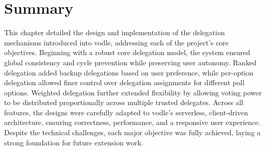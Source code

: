 \section{Summary}

This chapter detailed the design and implementation of the delegation mechanisms introduced into vodle, addressing each of the project's core objectives. Beginning with a robust core delegation model, the system ensured global consistency and cycle prevention while preserving user autonomy. Ranked delegation added backup delegations based on user preference, while per-option delegation allowed finer control over delegation assignments for different poll options. Weighted delegation further extended flexibility by allowing voting power to be distributed proportionally across multiple trusted delegates. Across all features, the designs were carefully adapted to vodle's serverless, client-driven architecture, ensuring correctness, performance, and a responsive user experience. Despite the technical challenges, each major objective was fully achieved, laying a strong foundation for future extension work.